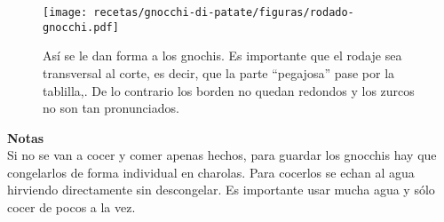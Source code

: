 \begin{figure}
\centering
\texttt{[image: recetas/gnocchi-di-patate/figuras/rodado-gnocchi.pdf]}
\caption{Así se le dan forma a los gnochis. Es importante que el rodaje sea transversal al corte, es decir, que la parte ``pegajosa'' pase por la tablilla,. De lo contrario los borden no quedan redondos y los zurcos no son tan pronunciados.}
\label{fig:rodado-gnocchi.pdf}
\end{figure}

\textbf{Notas}\\
Si no se van a cocer y comer apenas hechos, para guardar los gnocchis hay que congelarlos de forma individual en charolas. Para cocerlos se echan al agua hirviendo directamente sin descongelar. Es importante usar mucha agua y sólo cocer de pocos a la vez. 